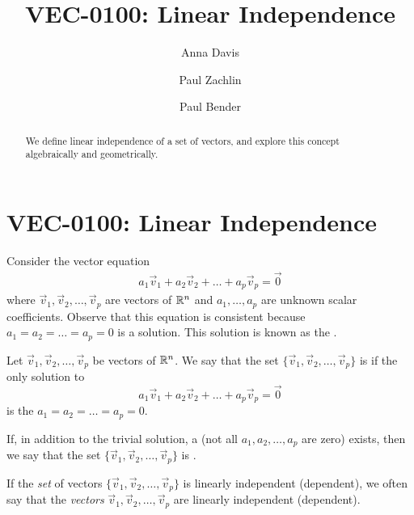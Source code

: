 \documentclass{ximera}
\author{Anna Davis \and Paul Zachlin \and Paul Bender} \title{VEC-0100: Linear Independence} \license{CC-BY 4.0}
\begin{document}
\begin{abstract}
 We define linear independence of a set of vectors, and explore this concept algebraically and geometrically.
\end{abstract}
\maketitle

\section*{VEC-0100: Linear Independence}

Consider the vector equation \begin{align}\label{eq:defoflinind}a_1\vec{v}_1+a_2\vec{v}_2+\ldots +a_p\vec{v}_p=\vec{0}\end{align}
 where $\vec{v}_1, \vec{v}_2,\ldots ,\vec{v}_p$ are vectors of $\mathbb{R}^n$ and $a_1, \ldots ,a_p$ are unknown scalar coefficients.
Observe that this equation is consistent because $a_1=a_2=\ldots =a_p=0$ is a solution.  This solution is known as the .

\begin{definition}\label{def:linearindependence}
Let $\vec{v}_1, \vec{v}_2,\ldots ,\vec{v}_p$ be vectors of $\mathbb{R}^n$.  We say that the set $\{\vec{v}_1, \vec{v}_2,\ldots ,\vec{v}_p\}$ is  if the only solution to 
$$a_1\vec{v}_1+a_2\vec{v}_2+\ldots +a_p\vec{v}_p=\vec{0}$$
is the  $a_1=a_2=\ldots =a_p=0$.

If, in addition to the trivial solution, a  (not all $a_1, a_2,\ldots ,a_p$ are zero) exists, then we say that the set $\{\vec{v}_1, \vec{v}_2,\ldots ,\vec{v}_p\}$ is .
\end{definition}

If the {\it set} of vectors $\{\vec{v}_1, \vec{v}_2,\ldots ,\vec{v}_p\}$ is linearly independent (dependent), we often say that the {\it vectors} $\vec{v}_1, \vec{v}_2,\ldots ,\vec{v}_p$ are linearly independent (dependent).

\end{document}
